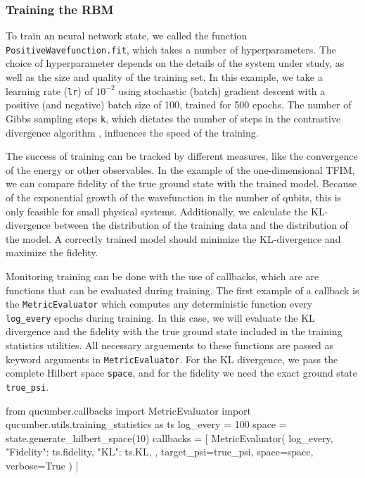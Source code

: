 \documentclass[submission, Phys]{SciPost}
\begin{document}
\subsubsection{Training the RBM}

To train an neural network state, we called the function \verb|PositiveWavefunction.fit|, which takes a number of hyperparameters.
The choice of hyperparameter depends on the details of the system under study, as well as the size and quality of the training set.
In this example, we take a learning rate (\verb|lr|) of $10^{-2}$ using stochastic (batch) gradient descent with a positive (and negative) batch size of 100, trained for 500 epochs.
The number of Gibbs sampling steps \verb|k|, which dictates the number of steps in the contrastive divergence algorithm \cite{hinton2002training},
influences the speed of the training. 


The success of training can be tracked by different measures, like the convergence of the energy or other observables.
In the example of the one-dimensional TFIM, we can compare fidelity of the true ground state with the trained model.
Because of the exponential growth of the wavefunction in the number of qubits, this is only feasible for small physical systems.
Additionally, we calculate the KL-divergence between the distribution of the training data and the distribution of the model.
A correctly trained model should minimize the KL-divergence and maximize the fidelity.

Monitoring training can be done with the use of callbacks, which are are functions that can be evaluated during training.
The first example of a callback is the \verb|MetricEvaluator| which computes any deterministic function every \verb|log_every| epochs during training.
 In this case, we will evaluate the KL divergence and the fidelity with the true ground state included in the training statistics utilities. 
 All necessary arguements to these functions are passed as keyword arguments in \verb|MetricEvaluator|. For the KL divergence, we pass the complete Hilbert space \verb|space|, and for the fidelity we need the exact ground state \verb|true_psi|. 
\begin{python}
from qucumber.callbacks import MetricEvaluator
import qucumber.utils.training_statistics as ts
log_every = 100
space = state.generate_hilbert_space(10)
callbacks = [
    MetricEvaluator(
        log_every,
        {
        "Fidelity": ts.fidelity, 
        "KL": ts.KL, 
        },
    target_psi=true_psi,
    space=space,
    verbose=True
    )
]
\end{python}
\end{document}
